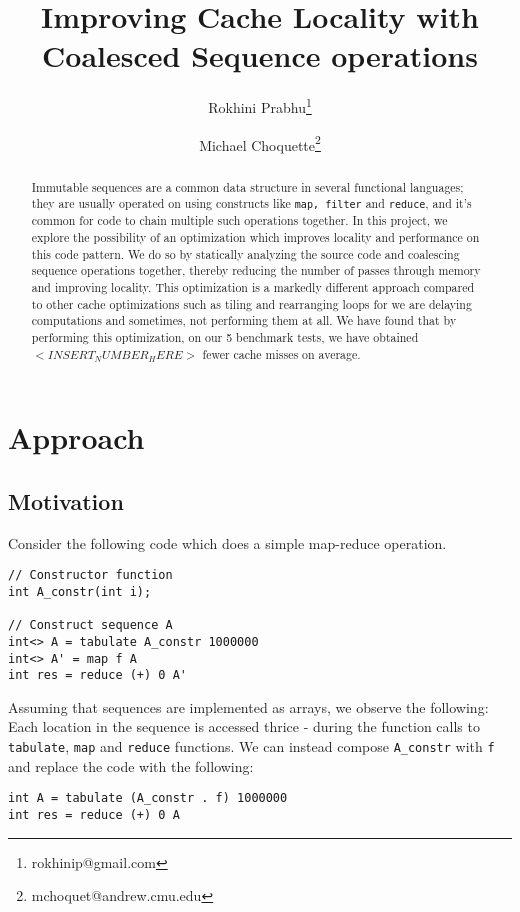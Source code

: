 \documentclass[a4paper,twocolumn]{article}
\title{Improving Cache Locality with Coalesced Sequence operations}
\date{\vspace{-5ex}}
\author{Rokhini Prabhu\thanks{rokhinip@gmail.com} }
\author{Michael Choquette\thanks{mchoquet@andrew.cmu.edu}}
\affil{Carnegie Mellon University}
\newcommand{\sml}[1]{\texttt{#1}}
\begin{document}
\maketitle

\begin{abstract}
Immutable sequences are a common data structure in several functional languages; they
are usually operated on using constructs like \sml{map, filter} and
\sml{reduce}, and it's common for code to chain multiple such operations together. In this
project, we explore the possibility of an optimization which improves locality and
performance on this code pattern. We do so by statically analyzing the source code and
coalescing sequence operations together, thereby reducing the number
of passes through memory and improving locality. This optimization is a
markedly different approach compared to other cache optimizations such as tiling and
rearranging loops for we are delaying computations and sometimes,
not performing them at all. We have found that by performing this
optimization, on our 5 benchmark tests, we have obtained $<INSERT_NUMBER_HERE>$
fewer cache misses on average.
\end{abstract}

\section{Approach}

\subsection{Motivation}
Consider the following code which does a simple map-reduce operation.

\begin{verbatim}
// Constructor function
int A_constr(int i);

// Construct sequence A
int<> A = tabulate A_constr 1000000
int<> A' = map f A
int res = reduce (+) 0 A'
\end{verbatim}

\noindent
Assuming that sequences are implemented as arrays, we observe the following:
Each location in the sequence is accessed thrice - during the function calls to
\sml{tabulate}, \sml{map} and \sml{reduce} functions. We can instead compose
\sml{A_constr} with \sml{f} and replace the code with the following:
\begin{verbatim}
int A = tabulate (A_constr . f) 1000000
int res = reduce (+) 0 A
\end{verbatim}
\end{document}
